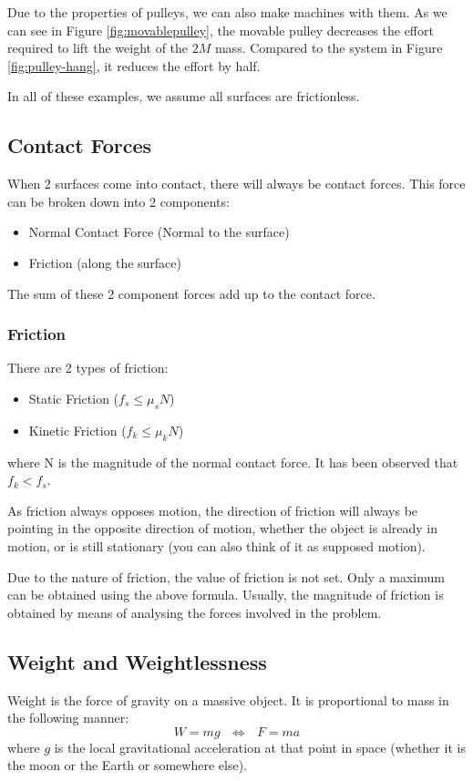 \documentclass[11pt]{article}
\numberwithin{equation}{section}
\begin{document}
			Due to the properties of pulleys, we can also make machines with them. As we can see in Figure \ref{fig:movablepulley}, the movable pulley decreases the effort required to lift the weight of the $2M$ mass. Compared to the system in Figure \ref{fig:pulley-hang}, it reduces the effort by half.
			
			In all of these examples, we assume all surfaces are frictionless.
			
		\pagebreak
		\subsection{Contact Forces}
		When 2 surfaces come into contact, there will always be contact forces. This force can be broken down into 2 components:
		\begin{itemize}
			\item Normal Contact Force (Normal to the surface)
			\item Friction (along the surface)
		\end{itemize}
		The sum of these 2 component forces add up to the contact force. 
			\subsubsection{Friction}
			There are 2 types of friction:
			\begin{itemize}
					\item Static Friction ($f_s \leq \mu_s N$)
					\item Kinetic Friction ($f_k \leq \mu_k N$) 
			\end{itemize}
			where N is the magnitude of the normal contact force. It has been observed that $f_k < f_s$.

			As friction always opposes motion, the direction of friction will always be pointing in the opposite direction of motion, whether the object is already in motion, or is still stationary (you can also think of it as supposed motion). 

			Due to the nature of friction, the value of friction is not set. Only a maximum can be obtained using the above formula. Usually, the magnitude of friction is obtained by means of analysing the forces involved in the problem. 
		\subsection{Weight and Weightlessness}
		Weight is the force of gravity on a massive object. It is proportional to mass in the following manner:
		\begin{equation}
			W = mg ~~~\Leftrightarrow~~~F=ma
		\end{equation}
		where $g$ is the local gravitational acceleration at that point in space (whether it is the moon or the Earth or somewhere else).
\end{document}

